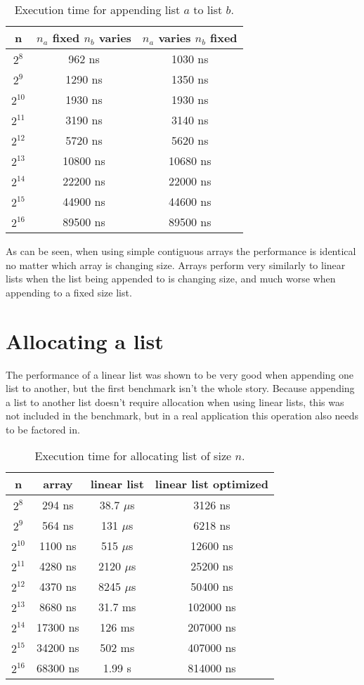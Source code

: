 \documentclass[a4paper,11pt]{article}
\begin{document}
\begin{table}[H]
\centering
\begin{tabular}{|c|c|c|}
\hline
\textbf{n} & \textbf{$n_a$ fixed $n_b$ varies} & \textbf{$n_a$ varies $n_b$ fixed} \\
\hline
	$2^{8}$ & 962 ns & 1030 ns \\
	$2^{9}$ & 1290 ns & 1350 ns \\
	$2^{10}$ & 1930 ns & 1930 ns \\
	$2^{11}$ & 3190 ns & 3140 ns \\
	$2^{12}$ & 5720 ns & 5620 ns \\
	$2^{13}$ & 10800 ns & 10680 ns \\
	$2^{14}$ & 22200 ns & 22000 ns \\
	$2^{15}$ & 44900 ns & 44600 ns \\
	$2^{16}$ & 89500 ns & 89500 ns \\
\hline
\end{tabular}
\caption{Execution time for appending list $a$ to list $b$.}
\label{tab:table2}
\end{table}

As can be seen, when using simple contiguous arrays the performance is identical no matter which array is changing size.
Arrays perform very similarly to linear lists when the list being appended to is changing size, and much worse when appending to a fixed size list.

\section*{Allocating a list}

The performance of a linear list was shown to be very good when appending one list to another, but the first benchmark isn't the whole story.
Because appending a list to another list doesn't require allocation when using linear lists, this was not included in the benchmark, but in a real application this operation also needs to be factored in.

\begin{table}[H]
\centering
\begin{tabular}{|c|c|c|c|}
\hline
\textbf{n} & \textbf{array} & \textbf{linear list} & \textbf{linear list optimized} \\
\hline
	$2^{8}$ & 294 ns & 38.7 $\mu$s & 3126 ns  \\
	$2^{9}$ & 564 ns & 131 $\mu$s & 6218 ns  \\
	$2^{10}$ & 1100 ns & 515 $\mu$s & 12600 ns  \\
	$2^{11}$ & 4280 ns & 2120 $\mu$s & 25200 ns  \\
	$2^{12}$ & 4370 ns & 8245 $\mu$s & 50400 ns  \\
	$2^{13}$ & 8680 ns & 31.7 ms & 102000 ns  \\
	$2^{14}$ & 17300 ns & 126 ms & 207000 ns  \\
	$2^{15}$ & 34200 ns & 502 ms & 407000 ns  \\
	$2^{16}$ & 68300 ns & 1.99 s & 814000 ns  \\
\hline
\end{tabular}
\caption{Execution time for allocating list of size $n$.}
\label{tab:table2}
\end{table}
\end{document}
